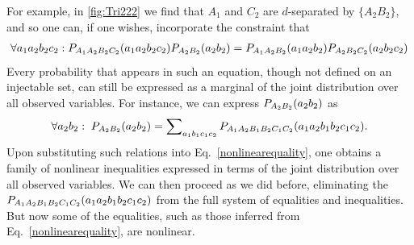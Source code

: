 For example, in \cref{fig:Tri222} we find that $A_1$ and $C_2$ are $d$-separated by $\{A_2 B_2\}$, and so one can, if one wishes, incorporate the constraint that 
\begin{align}\label{nonlinearequality}
\forall{a_1 a_2 b_2 c_2}: \p[A_1 A_2 B_2 C_2]{a_1 a_2 b_2 c_2}\p[A_2 B_2]{a_2 b_2}=\p[A_1 A_2 B_2]{a_1 a_2 b_2}\p[A_2 B_2 C_2]{a_2 b_2 c_2}
\end{align}
 Every probability that appears in such an equation, though not defined on an injectable set, can still be expressed as a marginal of the joint distribution over all observed variables.  For instance, we can express $\p[A_2 B_2]{a_2 b_2}$ as
\begin{align}
\forall{a_2 b_2}:\;\pdf[A_2 B_2]{a_2 b_2} = \sum\nolimits_{a_1 b_1 c_1 c_2}\pdf[A_1 A_2 B_1 B_2 C_1 C_2]{a_1 a_2 b_1 b_2 c_1 c_2}.
\end{align}
Upon substituting such relations into Eq.~\eqref{nonlinearequality}, one obtains a family of nonlinear inequalities expressed in terms of the joint distribution over all observed variables.  We can then proceed as we did before, eliminating the $\pdf[A_1 A_2 B_1 B_2 C_1 C_2]{a_1 a_2 b_1 b_2 c_1 c_2}$ from the full system of equalities and inequalities.  But now some of the equalities, such as those inferred from Eq.~\eqref{nonlinearequality}, are nonlinear.

